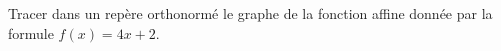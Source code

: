 
\begin{exercice}\label{exosmath-0511}

    Tracer dans un repère orthonormé le graphe de la fonction affine donnée par la formule \( f(x)=4x+2\).

\end{exercice}
